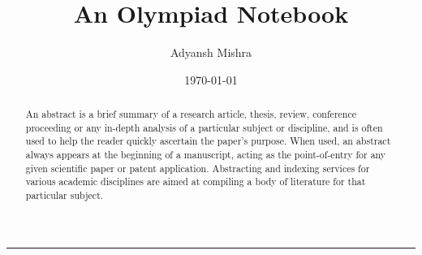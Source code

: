 \documentclass[twoside,a4paper,10pt]{memoir}
\author{
    Adyansh Mishra \\
    \mailto{adyanshmishra@proton.me}
}\date{\today}
\title{An Olympiad Notebook}
\begin{document}

\begin{titlingpage}
    \BgThispage
    \vspace*{0.4\textheight}
    \noindent
    \textcolor{white}{\Huge\textbf{\textsf{\thetitle}}}
    \vspace*{2cm}\par
    \noindent
    \begin{minipage}{0.35\linewidth}
        \begin{flushright}
            \printauthor
        \end{flushright}
    \end{minipage} \hspace{15pt}
    \begin{minipage}{0.02\linewidth}
        \rule{1pt}{175pt}
    \end{minipage} \hspace{-10pt}
    \begin{minipage}{0.63\linewidth}
    \vspace{5pt}
        \begin{abstract} 
    An abstract is a brief summary of a research article, thesis, review, conference proceeding or any in-depth analysis of a particular subject or discipline, and is often used to help the reader quickly ascertain the paper's purpose. When used, an abstract always appears at the beginning of a manuscript, acting as the point-of-entry for any given scientific paper or patent application. Abstracting and indexing services for various academic disciplines are aimed at compiling a body of literature for that particular subject.
        \end{abstract}
    \end{minipage}
\end{titlingpage}
    \restoregeometry

\frontmatter
    \fncytitle    
    \renewcommand*{\contentsname}{Short contents}
    \setcounter{tocdepth}{0}%
    \tableofcontents
    \clearpage
    \renewcommand*{\contentsname}{Contents}
    \setcounter{tocdepth}{1}%
    \tableofcontents
    
    \clearpage
    \listoffigures
    \restoregeometry
    \pagestyle{mystyle}
    

    \mainmatter 
    
    
  
    
    
    \appendix
    
    
    \backmatter
    \printindex
    \printbibliography
\end{document}
